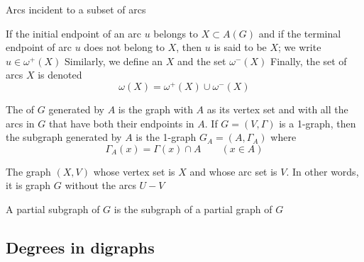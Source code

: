 \documentclass[aspectratio=169]{beamer}\usepackage[]{graphicx}\usepackage[]{xcolor}
\begin{document}
\begin{frame}{Arcs incident to a subset of arcs}
	\begin{definition}
		If the initial endpoint of an arc $u$ belongs to $X\subset A(G)$ and if the terminal endpoint of arc $u$ does not belong to $X$, then $u$ is said to be  $X$; we write $u\in\omega^+(X)$
		\vskip0.2cm
		Similarly, we define an  $X$ and the set $\omega^-(X)$
		\vskip0.2cm
		Finally, the set of arcs  $X$ is denoted
		\[
		\omega(X) = \omega^+(X)\cup\omega^-(X)
		\]
	\end{definition}
\end{frame}

\begin{frame}
	\begin{definition}
		The  of $G$ generated by $A$ is the graph with $A$ as its vertex set and with all the arcs in $G$ that have both their endpoints in $A$. If $G=(V,\Gamma)$ is a 1-graph, then the subgraph generated by $A$ is the 1-graph $G_A=(A,\Gamma_A)$ where
		\[
		\Gamma_A(x)=\Gamma(x)\cap A\qquad (x\in A)
		\]
	\end{definition}
	\vfill
	\begin{definition}
		\label{def:partial_graph}
		The graph $(X,V)$ whose vertex set is $X$ and whose arc set is $V$. 
		In other words, it is graph $G$ without the arcs $U-V$
	\end{definition}
	\vfill
	\begin{definition}
		A partial subgraph of $G$ is the subgraph of a partial graph of $G$
	\end{definition}
\end{frame}



\subsection{Degrees in digraphs}
\end{document}
